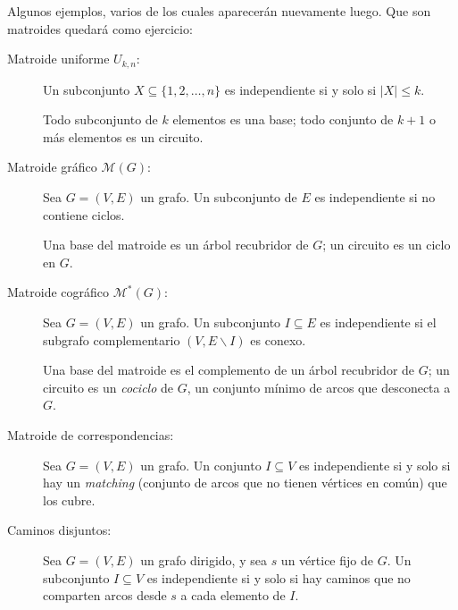   Algunos ejemplos,
  varios de los cuales aparecerán nuevamente luego.
  Que son matroides quedará como ejercicio:
  \begin{description}
  \item[Matroide uniforme \boldmath\(U_{k, n}\)\unboldmath:]
    Un subconjunto \(X \subseteq \{ 1, 2, \dotsc, n \}\)
    es independiente si y solo si \(\lvert X \rvert \le k\).

    Todo subconjunto de \(k\) elementos es una base;
    todo conjunto de \(k + 1\) o más elementos es un circuito.
  \item[Matroide gráfico \boldmath\(\mathscr{M}(G)\)\unboldmath:]
    Sea \(G = (V, E)\) un grafo.
    Un subconjunto de \(E\) es independiente si no contiene ciclos.

    Una base del matroide es un árbol recubridor de \(G\);
    un circuito es un ciclo en \(G\).
  \item[Matroide cográfico \boldmath\(\mathscr{M}^*(G)\)\unboldmath:]
    Sea \(G = (V, E)\) un grafo.
    Un subconjunto \(I \subseteq E\) es independiente
    si el subgrafo complementario \((V, E \smallsetminus I)\) es conexo.

    Una base del matroide es el complemento de un árbol recubridor de \(G\);
    un circuito es un \emph{cociclo} de \(G\),
    un conjunto mínimo de arcos que desconecta a \(G\).
  \item[Matroide de correspondencias:]
    Sea \(G = (V, E)\) un grafo.
    Un conjunto \(I \subseteq V\) es independiente si y solo si
    hay un \emph{\foreignlanguage{english}{matching}}
    (conjunto de arcos que no tienen vértices en común)
    que los cubre.
  \item[Caminos disjuntos:]
    Sea \(G = (V, E)\) un grafo dirigido,
    y sea \(s\) un vértice fijo de \(G\).
    Un subconjunto \(I \subseteq V\) es independiente si y solo si
    hay caminos que no comparten arcos desde \(s\) a cada elemento de \(I\).
  \end{description}

